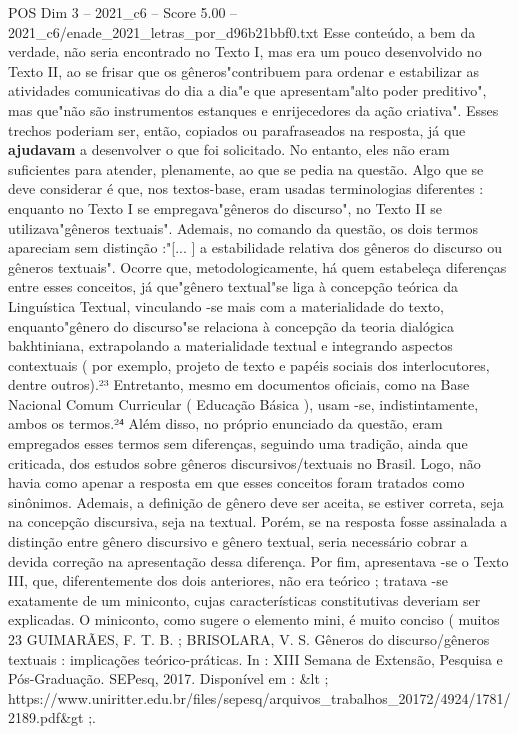 \begin{textsample}{POS Dim 3 – 2021\_c6 – Score 5.00 – 2021\_c6/enade\_2021\_letras\_por\_d96b21bbf0.txt}
Esse conteúdo, a bem da verdade, não seria encontrado no Texto I, mas era um pouco desenvolvido no Texto II, ao se frisar que os gêneros"contribuem para ordenar e estabilizar as atividades comunicativas do dia a dia"e que apresentam"alto poder preditivo", mas que"não são instrumentos estanques e enrijecedores da ação criativa".
Esses trechos poderiam ser, então, copiados ou parafraseados na resposta, já que \textbf{ajudavam} a desenvolver o que foi solicitado.
No entanto, eles não eram suficientes para atender, plenamente, ao que se pedia na questão.
Algo que se deve considerar é que, nos textos-base, eram usadas terminologias diferentes : enquanto no Texto I se empregava"gêneros do discurso", no Texto II se utilizava"gêneros textuais".
Ademais, no comando da questão, os dois termos apareciam sem distinção :"[... ] a estabilidade relativa dos gêneros do discurso ou gêneros textuais".
Ocorre que, metodologicamente, há quem estabeleça diferenças entre esses conceitos, já que"gênero textual"se liga à concepção teórica da Linguística Textual, vinculando -se mais com a materialidade do texto, enquanto"gênero do discurso"se relaciona à concepção da teoria dialógica bakhtiniana, extrapolando a materialidade textual e integrando aspectos contextuais ( por exemplo, projeto de texto e papéis sociais dos interlocutores, dentre outros).²³ Entretanto, mesmo em documentos oficiais, como na Base Nacional Comum Curricular ( Educação Básica ), usam -se, indistintamente, ambos os termos.²⁴ Além disso, no próprio enunciado da questão, eram empregados esses termos sem diferenças, seguindo uma tradição, ainda que criticada, dos estudos sobre gêneros discursivos/textuais no Brasil.
Logo, não havia como apenar a resposta em que esses conceitos foram tratados como sinônimos.
Ademais, a definição de gênero deve ser aceita, se estiver correta, seja na concepção discursiva, seja na textual.
Porém, se na resposta fosse assinalada a distinção entre gênero discursivo e gênero textual, seria necessário cobrar a devida correção na apresentação dessa diferença.
Por fim, apresentava -se o Texto III, que, diferentemente dos dois anteriores, não era teórico ; tratava -se exatamente de um miniconto, cujas características constitutivas deveriam ser explicadas.
O miniconto, como sugere o elemento mini, é muito conciso ( muitos 23 GUIMARÃES, F.
T.
B. ; BRISOLARA, V.
S.
Gêneros do discurso/gêneros textuais : implicações teórico-práticas.
In : XIII Semana de Extensão, Pesquisa e Pós-Graduação.
SEPesq, 2017.
Disponível em : \&lt ; https://www.uniritter.edu.br/files/sepesq/arquivos\_trabalhos\_20172/4924/1781/2189.pdf\&gt ;.

\end{textsample}

